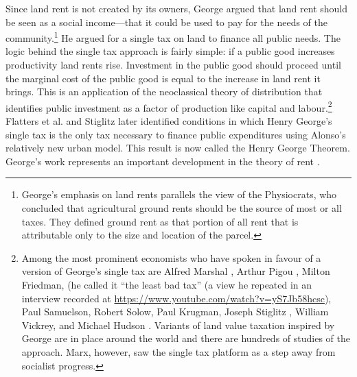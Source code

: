  Since land rent is not created by its owners, George argued that land rent should be seen as a social income---that it could be used to pay for the needs of the community.\footnote{George's emphasis on land rents parallels the view of the Physiocrats, who concluded that agricultural \gls{ground rents} should be the source of most or all taxes. They defined ground rent as that portion of all rent that is attributable only to the size and location of the parcel.} %
 He argued for a single tax on land to finance all public needs. The logic behind the single tax approach is fairly simple: if a public good increases productivity land rents rise. Investment in the public good should proceed until the marginal cost of the public good is equal to the increase in land rent it brings. This is an application of the neoclassical theory of distribution that identifies public investment  as a factor of production like capital and labour.\footnote{Among the most prominent economists who have spoken in favour of a version of George's single tax are Alfred Marshal \cite{marshallPrinciplesEconomics1890}, %
Arthur Pigou \cite{pigouPolicyLandTaxation1909}, Milton Friedman, (he called it ``the least bad tax'' \cite{friedmanInterview1978}  
(a view he repeated in an interview recorded at \url{https://www.youtube.com/watch?v=yS7Jb58hcsc}),  Paul Samuelson, Robert Solow, Paul Krugman, Joseph Stiglitz \cite{stiglitzTheoryLocalPublic1977}, William Vickrey, and Michael Hudson \cite{hudsonPhilosophyFairSociety1994}. Variants of land value taxation inspired by George are in place around the world and there are hundreds of studies of the approach. Marx, however, saw the \gls{single tax} platform as a step away from socialist progress.} Flatters et al. \cite{flattersPublicGoodsEfficiency1974} and  Stiglitz \cite{stiglitzTheoryLocalPublic1977} later identified conditions in which Henry George's \gls{single tax} is the only tax necessary to finance public expenditures using Alonso's relatively new urban model. This result is now called the \gls{Henry George Theorem}.  George's work represents an important development in the theory of rent \cite{arnottAggregateLandRents1979}.


